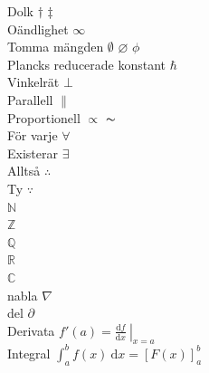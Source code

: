 \documentclass[12pt]{article}
\newcommand{\lowercaseheight}{1ex}
\newcommand{\uppercaseheight}{2ex}
\newcommand{\descenderdepth}{-0.5ex}
\newenvironment{drillsheet}{%
    \setlength\linenumbersep{0pt}%
    \renewcommand{\thelinenumber}{%
        \begin{tikzpicture}[overlay]
                \draw [black!25] ((0,0) -- ++(\textwidth,0);
                \draw [ultra thin,black!25] ((0,\lowercaseheight) -- ++(\textwidth,0);
                \draw [ultra thin,black!25] (0,\uppercaseheight - 0.1cm) -- ++(\textwidth,0);
                \draw [ultra thin,black!25] (0,\descenderdepth) -- ++(\textwidth,0);
        \end{tikzpicture}%
    }%
    \renewcommand\linenumberfont{\normalfont\color{black}}
    \begin{linenumbers}%
}{
    \end{linenumbers}%
}
\begin{document}
\begin{drillsheet}
    \noindent 
    Dolk $\dagger$ $\ddagger$ \\ 
	Oändlighet $\infty$ \\
	Tomma mängden $\emptyset$ $\varnothing$ $\phi$ \\
	Plancks reducerade konstant $\hbar$ \\
	Vinkelrät $\bot$ \\
	Parallell $\|$ \\
	Proportionell $\varpropto$ $\thicksim$ \\
	För varje $\forall$ \\
	Existerar $\exists$ \\
	Alltså $\therefore$ \\
	Ty $\because$ \\
	$\mathbb{N}$ \\
	$\mathbb{Z}$ \\
	$\mathbb{Q}$ \\
	$\mathbb{R}$ \\
	$\mathbb{C}$ \\
	nabla $\nabla$ \\
	del $\partial$ \\
	Derivata $f'(a) = \left.\frac{\text{d}f}{\text{d}x} \ \right|_{x=a}$ \\
	Integral $\int_a^b f(x) \ \text{d}x = \left[ F(x)\right]_a^b$     
\end{drillsheet}
\end{document}
